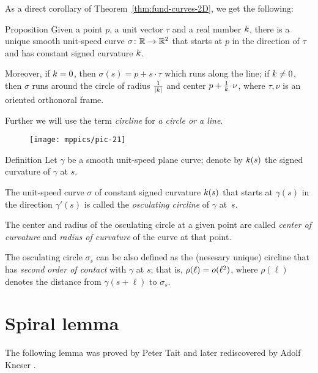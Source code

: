 As a direct corollary of Theorem~\ref{thm:fund-curves-2D}, we get the following:

\begin{thm}{Proposition}\label{prop:circline}
Given a point $p$,
a unit vector $\tau$ 
and a real number $k$, there is a unique smooth unit-speed curve $\sigma\colon\mathbb{R}\to\mathbb{R}^2$ 
that starts at $p$ in the direction of $\tau$ and has constant signed curvature $k$.

Moreover, if $k=0$, then $\sigma(s)=p+s\cdot \tau$ which runs along the line;
if $k\ne 0$, then $\sigma$ runs around the circle of radius $\tfrac1{|k|}$ and center $p+\tfrac1\skur\cdot \nu$, where $\tau,\nu$ is an oriented orthonoral frame.
\end{thm}

Further we will use the term \emph{circline} for \emph{a circle or a line}.

{

\begin{wrapfigure}{r}{31 mm}
\vskip-0mm
\centering
\texttt{[image: mppics/pic-21]}
\vskip0mm
\end{wrapfigure}

\begin{thm}{Definition}
Let $\gamma$ be a smooth unit-speed plane curve;
denote by $k(s)$ the signed curvature of $\gamma$ at $s$.

The unit-speed curve $\sigma$ of constant signed curvature $k(s)$ that starts at $\gamma(s)$ in the direction $\gamma'(s)$ is called the \emph{osculating circline} of $\gamma$ at~$s$.
\end{thm}

}

The center and radius of the osculating circle at a given point are called \emph{center of curvature} and \emph{radius of curvature} of the curve at that point.

The osculating circle $\sigma_s$ can be also defined as the (nesesary unique) circline that has \emph{second order of contact} with $\gamma$ at $s$;
that is, $\rho(\ell)\z=o(\ell^2)$, where $\rho(\ell)$ denotes the distance from $\gamma(s+\ell)$ to $\sigma_s$.

\section*{Spiral lemma}
\label{spiral}

The following lemma was proved by Peter Tait \cite{tait}
and later rediscovered by Adolf Kneser \cite{kneser}.

